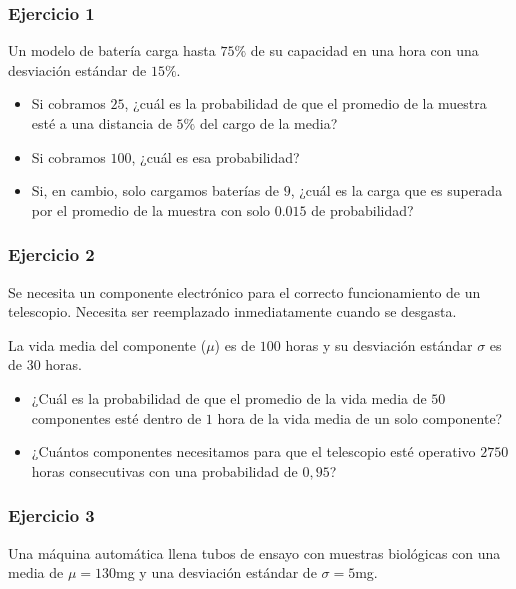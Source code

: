 \documentclass[
]{book}
\begin{document}
\hypertarget{ejercicio-1-6}{%
\subsubsection{Ejercicio 1}\label{ejercicio-1-6}}

Un modelo de batería carga hasta \(75\%\) de su capacidad en una hora con una desviación estándar de \(15\%\).

\begin{itemize}
\item
  Si cobramos \(25\), ¿cuál es la probabilidad de que el promedio de la muestra esté a una distancia de \(5\%\) del cargo de la media?
\item
  Si cobramos \(100\), ¿cuál es esa probabilidad?
\item
  Si, en cambio, solo cargamos baterías de \(9\), ¿cuál es la carga que es superada por el promedio de la muestra con solo \(0.015\) de probabilidad?
\end{itemize}

\hypertarget{ejercicio-2-6}{%
\subsubsection{Ejercicio 2}\label{ejercicio-2-6}}

Se necesita un componente electrónico para el correcto funcionamiento de un telescopio. Necesita ser reemplazado inmediatamente cuando se desgasta.

La vida media del componente (\(\mu\)) es de \(100\) horas y su desviación estándar \(\sigma\) es de \(30\) horas.

\begin{itemize}
\item
  ¿Cuál es la probabilidad de que el promedio de la vida media de \(50\) componentes esté dentro de \(1\) hora de la vida media de un solo componente?
\item
  ¿Cuántos componentes necesitamos para que el telescopio esté operativo \(2750\) horas consecutivas con una probabilidad de \(0,95\)?
\end{itemize}

\hypertarget{ejercicio-3-3}{%
\subsubsection{Ejercicio 3}\label{ejercicio-3-3}}

Una máquina automática llena tubos de ensayo con muestras biológicas con una media de \(\mu=130\)mg y una desviación estándar de \(\sigma=5\)mg.
\end{document}
